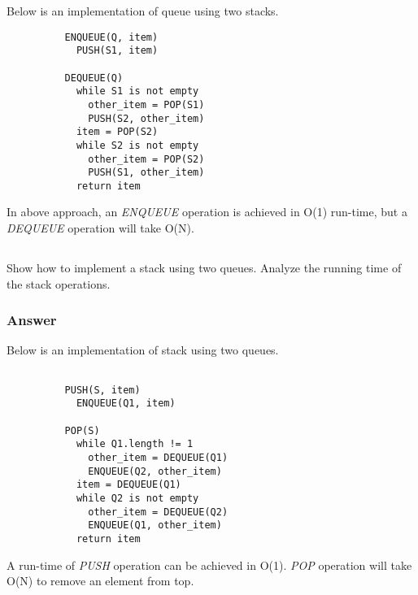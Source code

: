         Below is an implementation of queue using two stacks.

        \begin{verbatim}
          ENQUEUE(Q, item)
            PUSH(S1, item)

          DEQUEUE(Q)
            while S1 is not empty
              other_item = POP(S1)
              PUSH(S2, other_item)
            item = POP(S2)
            while S2 is not empty
              other_item = POP(S2)
              PUSH(S1, other_item)
            return item
        \end{verbatim}

        In above approach, an \textit{ENQUEUE} operation is achieved in O(1)
        run-time, but a \textit{DEQUEUE} operation will take O(N).

      \subsection{}

        Show how to implement a stack using two queues. Analyze the running
        time of the stack operations.

        \subsubsection{Answer}

        Below is an implementation of stack using two queues.

        \begin{verbatim}

          PUSH(S, item)
            ENQUEUE(Q1, item)

          POP(S)
            while Q1.length != 1
              other_item = DEQUEUE(Q1)
              ENQUEUE(Q2, other_item)
            item = DEQUEUE(Q1)
            while Q2 is not empty
              other_item = DEQUEUE(Q2)
              ENQUEUE(Q1, other_item)
            return item
        \end{verbatim}

        A run-time of \textit{PUSH} operation can be achieved in O(1).
        \textit{POP} operation will take O(N) to remove an element from top.
